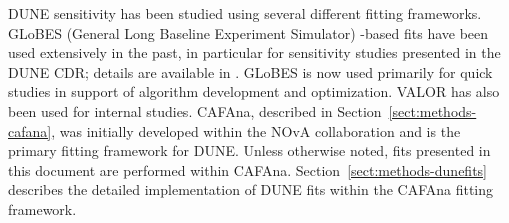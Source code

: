 DUNE sensitivity has been studied using several different fitting frameworks. GLoBES (General Long Baseline Experiment Simulator)\cite{Huber:2004ka,Huber:2007ji} %
-based fits have been used extensively in the past, in particular for sensitivity studies presented in the DUNE CDR; details are available in \cite{Acciarri:2015uup,Alion:2016uaj,Bass:2014vta}. GLoBES is now used primarily for quick studies in support of algorithm development and optimization. VALOR\cite{valorweb} has also been used for internal studies. CAFAna, described in Section~\ref{sect:methods-cafana}, was initially developed within the NOvA collaboration and is the primary fitting framework for DUNE. Unless otherwise noted, fits presented in this document are performed within CAFAna. Section~\ref{sect:methods-dunefits} describes the detailed implementation of DUNE fits within the CAFAna fitting framework.

